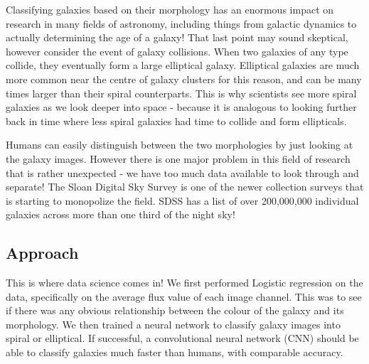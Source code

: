 Classifying galaxies based on their morphology has an enormous impact on research in many fields of astronomy, including things from galactic dynamics to actually determining the age of a galaxy!
That last point may sound skeptical, however consider the event of galaxy collisions.
When two galaxies of any type collide, they eventually form a large elliptical galaxy. 
Elliptical galaxies are much more common near the centre of galaxy clusters for this reason, and can be many times larger than their spiral counterparts.
This is why scientists see more spiral galaxies as we look deeper into space - because it is analogous to looking further back in time where less spiral galaxies had time to collide and form ellipticals. 


Humans can easily distinguish between the two morphologies by just looking at the galaxy images. 
However there is one major problem in this field of research that is rather unexpected - we have too much data available to look through and separate! 
The Sloan Digital Sky Survey is one of the newer collection surveys that is starting to monopolize the field. SDSS has a list of over 200,000,000 individual galaxies across more than one third of the night sky\cite{SDSS}!

\subsection{Approach}
This is where data science comes in!
We first performed Logistic regression on the data, specifically on the average flux value of each image channel. 
This was to see if there was any obvious relationship between the colour of the galaxy and its morphology. 
We then trained a neural network to classify galaxy images into spiral or elliptical.
If successful, a convolutional neural network (CNN) should be able to classify galaxies much faster than humans, with comparable accuracy.












